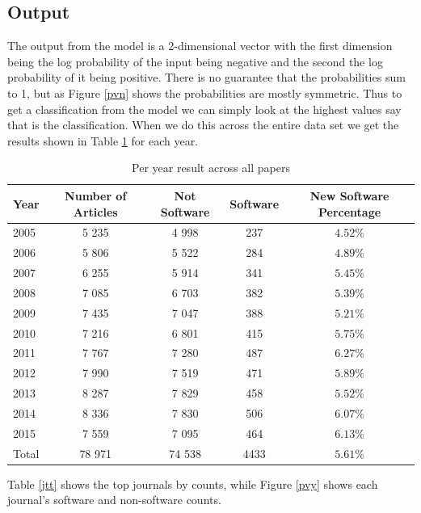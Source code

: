 \documentclass[12pt, a4paper]{article}
\begin{document}
\subsection{Output}

The output from the model is a 2-dimensional vector with the first dimension being the log probability of the input being negative and the second the log probability of it being positive. There is no guarantee that the probabilities sum to 1, but as Figure \ref{pvn} shows the probabilities are mostly symmetric. Thus to get a classification from the model we can simply look at the highest values say that is the classification. When we do this across the entire data set we get the results shown in Table \ref{yt} for each year.

	\begin{table}[H]
	\centering
	\begin{tabular}{|l| cccc|}
		\toprule
		Year& Number of Articles & Not Software &  Software & New Software Percentage\\
		\midrule[2pt]
		2005&	5 235&	4 998&	237&$4.52\%$\\
		2006&	5 806&	5 522&	284&$4.89\%$\\
		2007&	6 255&	5 914&	341&$5.45\%$\\
		2008&	7 085&	6 703&	382	&$5.39\%$\\
		2009&	7 435&	7 047&	388	&$5.21\%$\\
		2010&	7 216&	6 801&	415	&$5.75\%$\\
		2011&	7 767&	7 280&	487	&$6.27\%$\\
		2012&	7 990&	7 519&	471	&$5.89\%$\\
		2013&	8 287&	7 829&	458	&$5.52\%$\\
		2014&	8 336&	7 830&	506	&$6.07\%$\\
		2015&	7 559&	7 095&	464	&$6.13\%$\\
		\midrule[1pt]
		Total & 78 971 &74 538&  4433& $5.61\%$\\
		\bottomrule
	\end{tabular}
	\caption{Per year result across all papers}\label{yt}
\end{table}

Table \ref{jtt} shows the top journals by counts, while Figure \ref{pvy} shows each journal's software and non-software counts. 
\end{document}

